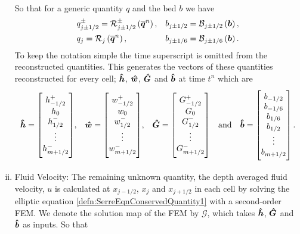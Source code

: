 \begin{enumerate}[(i)]
	So that for a generic quantity $q$ and the bed $b$ we have
	\begin{align*}
	&q^\pm_{j\pm 1/2} = \mathcal{R}^\pm_{j \pm1/2} \left(\overline{\boldsymbol{q}}^n\right), &&b_{j\pm 1/2} = \mathcal{B}_{j\pm 1/2} \left(\boldsymbol{b}\right),  \\
	&q_{j} = \mathcal{R}_{j} \left(\overline{\boldsymbol{q}}^n\right), &&b_{j\pm 1/6} = \mathcal{B}_{j\pm 1/6}  \left(\boldsymbol{b}\right).
	\end{align*}
	To keep the notation simple the time superscript is omitted from the reconstructed quantities.	This generates the vectors of these quantities reconstructed for every cell; $\boldsymbol{\hat{h}}$, $\boldsymbol{\hat{w}}$, $\boldsymbol{\hat{G}}$ and $\boldsymbol{\hat{b}}$ at time $t^n$ which are
	\begin{align*}\vecn{\hat{h}} = \begin{bmatrix} \TM
	h^+_{-1/2} \\ h_0 \\ h^-_{1/2} \\ \vdots  \\ h^-_{m+1/2} \BM \end{bmatrix} &,&
	\vecn{\hat{w}} = \begin{bmatrix} \TM
	w^+_{-1/2} \\ w_0 \\ w^-_{1/2}  \\ \vdots  \\ w^-_{m+1/2} \BM \end{bmatrix} &,& \vecn{\hat{G}} = \begin{bmatrix} \TM
	G^+_{-1/2} \\ G_0 \\ G^-_{1/2}  \\ \vdots \\ G^-_{m+1/2} \BM
	\end{bmatrix} & &\text{and}& & \vecn{\hat{b}} = \begin{bmatrix} \TM
	b_{-1/2} \\ b_{-1/6} \\ b_{1/6}  \\b_{1/2}  \\ \vdots \\ b_{m+1/2} \BM
	\end{bmatrix}.
	\end{align*}	
	\item Fluid Velocity: The remaining unknown quantity, the depth averaged fluid velocity, $u$ is calculated at $x_{j-1/2}$, $x_j$ and $x_{j+1/2}$ in each cell by solving the elliptic equation \eqref{defn:SerreEqnConservedQuantity1} with a second-order FEM. We denote the solution map of the FEM by $\mathcal{G}$, which takes $\boldsymbol{\hat{h}}$, $\boldsymbol{\hat{G}}$ and $\boldsymbol{\hat{b}}$ as inputs. So that

\end{enumerate}
